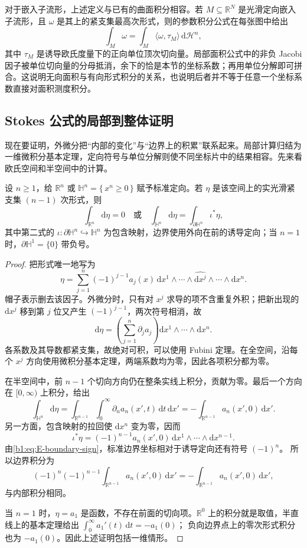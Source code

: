 对于嵌入子流形，上述定义与已有的曲面积分相容。若 \(M\subseteq\mathbb R^N\) 是光滑定向嵌入子流形，且 \(\omega\) 是其上的紧支集最高次形式，则的参数积分公式在每张图中给出
\[
 \int_M\omega
   =\int_M\langle\omega,\tau_M\rangle\,\mathrm d\mathcal H^n,
\]
其中 \(\tau_M\) 是诱导欧氏度量下的正向单位顶次切向量。局部面积公式中的非负 Jacobi 因子被单位切向量的分母抵消，余下的恰是本节的坐标系数；再用单位分解即可拼合。这说明无向面积与有向形式积分的关系，也说明后者并不等于任意一个坐标系数直接对面积测度积分。

\subsection{Stokes 公式的局部到整体证明}
\label{b1:subsec:E10403}

现在要证明，外微分把“内部的变化”与“边界上的积累”联系起来。局部计算归结为一维微积分基本定理，定向符号与单位分解则使不同坐标片中的结果相容。先来看欧氏空间和半空间中的计算。

\begin{lemma}\label{b1:lem:E-stokes-half-space}
设 \(n\geq1\)，给 \(\mathbb R^n\) 或 \(\mathbb H^n=\{\,x^n\geq0\,\}\) 赋予标准定向。若 \(\eta\) 是该空间上的实光滑紧支集 \((n-1)\) 次形式，则
\[
 \int_{\mathbb R^n}\mathrm d\eta=0
 \quad\text{或}\quad
 \int_{\mathbb H^n}\mathrm d\eta
       =\int_{\partial \mathbb H^n}\iota^*\eta,
\]
其中第二式的 \(\iota:\partial \mathbb H^n\hookrightarrow \mathbb H^n\) 为包含映射，边界使用外向在前的诱导定向；当 \(n=1\) 时，\(\partial \mathbb H^1=\{0\}\) 带负号。
\end{lemma}
\begin{proof}
把形式唯一地写为
\[
 \eta=\sum_{j=1}^n(-1)^{j-1}a_j(x)\,
   \mathrm dx^1\wedge\cdots\wedge
   \widehat{\mathrm dx^j}\wedge\cdots\wedge\mathrm dx^n.
\]
帽子表示删去该因子。外微分时，只有对 \(x^j\) 求导的项不含重复外积；把新出现的 \(\mathrm dx^j\) 移到第 \(j\) 位又产生 \((-1)^{j-1}\)，两次符号相消，故
\[
 \mathrm d\eta=
   \left(\sum_{j=1}^n\partial_ja_j\right)
                     \mathrm dx^1\wedge\cdots\wedge\mathrm dx^n.
\]
各系数及其导数都紧支集，故绝对可积，可以使用 Fubini 定理。在全空间，沿每个 \(x^j\) 方向使用微积分基本定理，两端系数均为零，因此各项积分都为零。

在半空间中，前 \(n-1\) 个切向方向仍在整条实线上积分，贡献为零。最后一个方向在 \([0,\infty)\) 上积分，给出
\[
 \int_{\mathbb H^n}\mathrm d\eta
 =\int_{\mathbb R^{n-1}}\int_0^\infty
         \partial_na_n(x',t)\,\mathrm dt\,\mathrm dx'
 =-\int_{\mathbb R^{n-1}}a_n(x',0)\,\mathrm dx'.
\]
另一方面，包含映射的拉回使 \(\mathrm dx^n\) 变为零，因而
\[
 \iota^*\eta=(-1)^{n-1}a_n(x',0)\,
                   \mathrm dx^1\wedge\cdots\wedge\mathrm dx^{n-1}.
\]
由\eqref{b1:eq:E-boundary-sign}，标准边界坐标相对于诱导定向还有符号 \((-1)^n\)。
所以边界积分为
\[
 (-1)^n(-1)^{n-1}\int_{\mathbb R^{n-1}}a_n(x',0)\,\mathrm dx'
 =-\int_{\mathbb R^{n-1}}a_n(x',0)\,\mathrm dx',
\]
与内部积分相同。

当 \(n=1\) 时，\(\eta=a_1\) 是函数，不存在前面的切向项。\(\mathbb R^0\) 上的积分就是取值，半直线上的基本定理给出
\(\int_0^\infty a_1'(t)\,\mathrm dt=-a_1(0)\)；
负向边界点上的零次形式积分也为 \(-a_1(0)\)。因此上述证明包括一维情形。
\end{proof}

